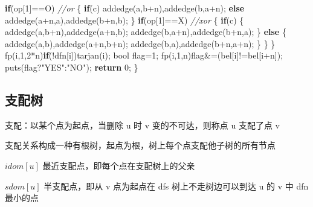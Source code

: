\documentclass[
]{article}
\newenvironment{Shaded}{}{}
\newcommand{\CharTok}[1]{\textcolor[rgb]{0.25,0.44,0.63}{#1}}
\newcommand{\CommentTok}[1]{\textcolor[rgb]{0.38,0.63,0.69}{\textit{#1}}}
\newcommand{\ControlFlowTok}[1]{\textcolor[rgb]{0.00,0.44,0.13}{\textbf{#1}}}
\newcommand{\DataTypeTok}[1]{\textcolor[rgb]{0.56,0.13,0.00}{#1}}
\newcommand{\DecValTok}[1]{\textcolor[rgb]{0.25,0.63,0.44}{#1}}
\newcommand{\NormalTok}[1]{#1}
\newcommand{\StringTok}[1]{\textcolor[rgb]{0.25,0.44,0.63}{#1}}
\begin{document}
\begin{Shaded}
\begin{Highlighting}[]
        \ControlFlowTok{if}\NormalTok{(op[}\DecValTok{1}\NormalTok{]==}\CharTok{\textquotesingle{}O\textquotesingle{}}\NormalTok{) }\CommentTok{//or}
\NormalTok{        \{}
            \ControlFlowTok{if}\NormalTok{(c) addedge(a,b+n),addedge(b,a+n);}
            \ControlFlowTok{else}\NormalTok{  addedge(a+n,a),addedge(b+n,b);}
\NormalTok{        \}}
        \ControlFlowTok{if}\NormalTok{(op[}\DecValTok{1}\NormalTok{]==}\CharTok{\textquotesingle{}X\textquotesingle{}}\NormalTok{) }\CommentTok{//xor}
\NormalTok{        \{}
            \ControlFlowTok{if}\NormalTok{(c)}
\NormalTok{            \{}
\NormalTok{                addedge(a,b+n),addedge(a+n,b);}
\NormalTok{                addedge(b,a+n),addedge(b+n,a);}
\NormalTok{            \}}
            \ControlFlowTok{else}
\NormalTok{            \{}
\NormalTok{                addedge(a,b),addedge(a+n,b+n);}
\NormalTok{                addedge(b,a),addedge(b+n,a+n);}
\NormalTok{            \}}
\NormalTok{        \}}
\NormalTok{    \}}
\NormalTok{    fp(i,}\DecValTok{1}\NormalTok{,}\DecValTok{2}\NormalTok{*n)}\ControlFlowTok{if}\NormalTok{(!dfn[i])tarjan(i);}
    \DataTypeTok{bool}\NormalTok{ flag=}\DecValTok{1}\NormalTok{;}
\NormalTok{    fp(i,}\DecValTok{1}\NormalTok{,n)flag\&=(bel[i]!=bel[i+n]);}
\NormalTok{    puts(flag?}\StringTok{"YES"}\NormalTok{:}\StringTok{"NO"}\NormalTok{);}
    \ControlFlowTok{return} \DecValTok{0}\NormalTok{;}
\NormalTok{\}}
\end{Highlighting}
\end{Shaded}

\hypertarget{ux652fux914dux6811}{%
\subsection{支配树}\label{ux652fux914dux6811}}

支配：以某个点为起点，当删除 u 时 v 变的不可达，则称点 u 支配了点 v

支配关系构成一种有根树，起点为根，树上每个点支配他子树的所有节点

\(idom[u]\) 最近支配点，即每个点在支配树上的父亲

\(sdom[u]\) 半支配点，即从 v 点为起点在 dfs 树上不走树边可以到达 u 的 v
中 dfn 最小的点
\end{document}
